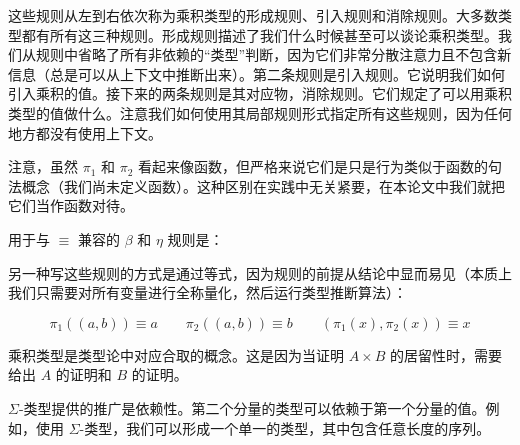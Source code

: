 \documentclass{ctexrep}
\theoremstyle{plain}
\theoremstyle{definition}
\theoremstyle{remark}
\theoremstyle{definition}
\theoremstyle{definition}
\theoremstyle{definition}
\begin{document}
这些规则从左到右依次称为乘积类型的形成规则、引入规则和消除规则。大多数类型都有所有这三种规则。形成规则描述了我们什么时候甚至可以谈论乘积类型。我们从规则中省略了所有非依赖的“类型”判断，因为它们非常分散注意力且不包含新信息（总是可以从上下文中推断出来）。第二条规则是引入规则。它说明我们如何引入乘积的值。接下来的两条规则是其对应物，消除规则。它们规定了可以用乘积类型的值做什么。注意我们如何使用其局部规则形式指定所有这些规则，因为任何地方都没有使用上下文。

注意，虽然 $\pi_1$ 和 $\pi_2$ 看起来像函数，但严格来说它们是只是行为类似于函数的句法概念（我们尚未定义函数）。这种区别在实践中无关紧要，在本论文中我们就把它们当作函数对待。

用于与 $\equiv$ 兼容的 $\beta$ 和 $\eta$ 规则是：

另一种写这些规则的方式是通过等式，因为规则的前提从结论中显而易见（本质上我们只需要对所有变量进行全称量化，然后运行类型推断算法）：

\[
\pi_1((a,b)) \equiv a \qquad \pi_2((a,b)) \equiv b \qquad (\pi_1(x), \pi_2(x)) \equiv x
\]

乘积类型是类型论中对应合取的概念。这是因为当证明 $A \times B$ 的居留性时，需要给出 $A$ 的证明和 $B$ 的证明。

$\Sigma$-类型提供的推广是依赖性。第二个分量的类型可以依赖于第一个分量的值。例如，使用 $\Sigma$-类型，我们可以形成一个单一的类型，其中包含任意长度的序列。
\end{document}
